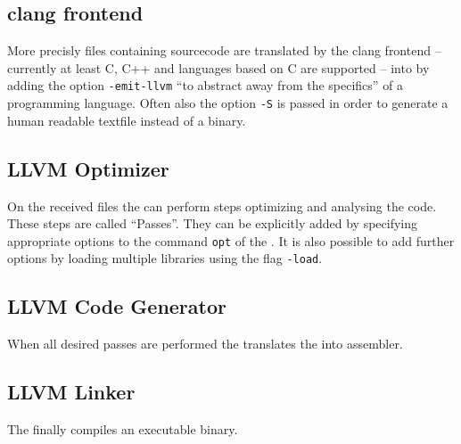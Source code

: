 \subsection{clang frontend}
More precisly files containing sourcecode are translated by the clang frontend -- currently at least C, C++ and languages based on C are supported -- into \llvmir by adding the option \texttt{-emit-llvm} \enquote{to abstract away from the specifics} \cite{FastScopDetection} of a programming language.
Often also the option \texttt{-S} is passed in order to generate a human readable textfile instead of a \llvmir binary.
\subsection{LLVM Optimizer}\label{subsec:optimizer}
On the received files the \opt can perform steps optimizing and analysing the code.
These steps are called \enquote{Passes}.
They can be explicitly added by specifying appropriate options to the command \texttt{opt} of the \opt.
It is also possible to add further options by loading multiple libraries using the flag \texttt{-load}.
\subsection{LLVM Code Generator}
When all desired passes are performed the \generator translates the \llvmir into assembler.
\subsection{LLVM Linker}
The \linker finally compiles an executable binary.
